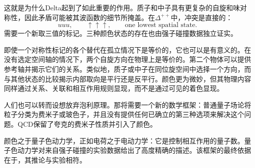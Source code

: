 这就是为什么Delta起到了如此重要的作用。质子和中子具有更复杂的自旋和味对称性，因此矛盾可能被其波函数的细节所掩盖。在\(\Delta^{++}\)中，冲突是直接的：
\begin{equation}
uuu,\qquad
\uparrow\uparrow\uparrow,
\qquad
\text{one lowest spatial state}.
\end{equation}
需要一个新取三值的标记。三种颜色状态的存在也由强子碰撞数据独立证实。

即使一个对称性标记的各个替代在孤立情况下是等价的，它也可以是有意义的。在没有选定空间轴的情况下，两个自旋方向在物理上是等价的。第二个物体可以提供参考轴并揭示它们的关系。类似地，质子或中子在同位旋空间中选择一个方向，而与其他状态的比较揭示内部取向是平行还是反平行。颜色更为微妙，但其物理内容同样通过关系、关联和相互作用规则显现，而不是通过可见的着色显现。

人们也可以转而设想放弃泡利原理。那将需要一个新的数学框架：普通量子场论将粒子分类为费米子或玻色子，并且没有提供任何已确立的第三种选项来解决这个问题。QCD保留了夸克的费米子性质并引入了颜色。

\begin{classroomqa}
\end{classroomqa}

\begin{classroomqa}
\end{classroomqa}


\begin{classroomqa}
\end{classroomqa}

颜色之于量子色动力学，正如电荷之于电动力学：它是控制相互作用的量子数。量子色动力学对来自强子碰撞的实验数据给出了高度精确的描述。该框架的最终依据在于，其推论与实验相符。

